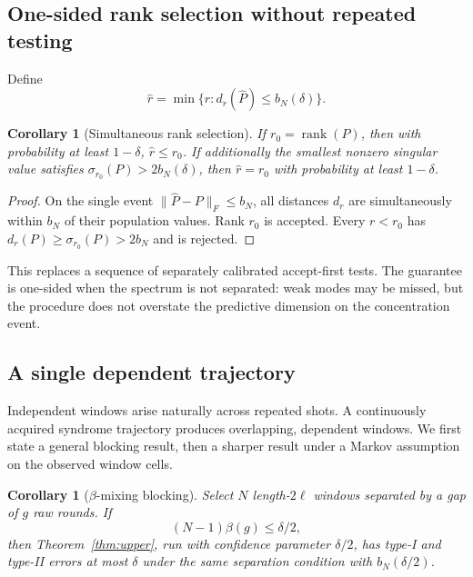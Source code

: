 \documentclass[11pt]{article}
\newtheorem{corollary}[theorem]{Corollary}
\newcommand{\rank}{\operatorname{rank}}
\begin{document}
\subsection{One-sided rank selection without repeated testing}

Define
\begin{equation}
    \widehat r=\min\{r:d_r(\widehat P)\le b_N(\delta)\}.
    \label{eq:rhat}
\end{equation}

\begin{corollary}[Simultaneous rank selection]
\label{cor:selection}
If $r_0=\rank(P)$, then with probability at least $1-\delta$,
$\widehat r\le r_0$. If additionally the smallest nonzero singular value satisfies
$\sigma_{r_0}(P)>2b_N(\delta)$, then $\widehat r=r_0$ with probability at least $1-\delta$.
\end{corollary}

\begin{proof}
On the single event $\|\widehat P-P\|_F\le b_N$, all distances $d_r$ are simultaneously within $b_N$ of their population values. Rank $r_0$ is accepted. Every $r<r_0$ has $d_r(P)\ge\sigma_{r_0}(P)>2b_N$ and is rejected.
\end{proof}

This replaces a sequence of separately calibrated accept-first tests. The guarantee is one-sided when the spectrum is not separated: weak modes may be missed, but the procedure does not overstate the predictive dimension on the concentration event.

\subsection{A single dependent trajectory}

Independent windows arise naturally across repeated shots. A continuously acquired syndrome trajectory produces overlapping, dependent windows. We first state a general blocking result, then a sharper result under a Markov assumption on the observed window cells.

\begin{corollary}[$\beta$-mixing blocking]
\label{cor:mixing}
Select $N$ length-$2\ell$ windows separated by a gap of $g$ raw rounds. If
\begin{equation}
    (N-1)\beta(g)\le\delta/2,
\end{equation}
then Theorem~\ref{thm:upper}, run with confidence parameter $\delta/2$, has type-I and type-II errors at most $\delta$ under the same separation condition with $b_N(\delta/2)$.
\end{corollary}
\end{document}
